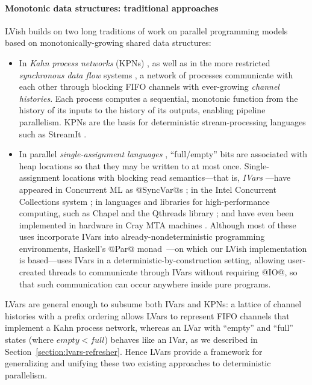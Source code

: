 \paragraph{Monotonic data structures: traditional approaches}

LVish builds on two long traditions of work on parallel programming
models based on monotonically-growing shared data structures:
\begin{itemize}
\item In {\em Kahn process networks} (KPNs) \cite{Kahn-1974}, as well
  as in the more restricted {\em synchronous data flow} systems
  \cite{Lee-sdn}, a network of processes communicate with each other
  through blocking FIFO channels with ever-growing {\em channel
    histories}.  Each process computes a sequential, monotonic
  function from the history of its inputs to the history of its
  outputs, enabling pipeline parallelism.  KPNs are the basis for
  deterministic stream-processing languages such as StreamIt
  \cite{streamit-asplos}.
\item In parallel {\em single-assignment languages}
  \cite{Tesler-1968}, ``full/empty'' bits are associated with heap
  locations so that they may be written to at most once.
  Single-assignment locations with blocking read semantics---that is,
  \emph{IVars} \cite{IStructures}---have appeared in Concurrent ML as
  @SyncVar@s \cite{reppy-cml-book}; in the Intel Concurrent
  Collections system \cite{CnC}; in languages and libraries for
  high-performance computing, such as Chapel \cite{chapel} and the
  Qthreads library \cite{qthreads}; and have even been implemented in
  hardware in Cray MTA machines \cite{cray-mta}.  Although most of
  these uses incorporate IVars into already-nondeterministic
  programming environments, Haskell's @Par@
  monad~\cite{monad-par}---on which our LVish implementation is
  based---uses IVars in a deterministic-by-construction setting,
  allowing user-created threads to communicate through IVars without
  requiring @IO@, so that such communication can occur anywhere inside
  pure programs.
\end{itemize}
LVars are general enough to subsume both IVars and KPNs: a lattice of
channel histories with a prefix ordering allows LVars to represent
FIFO channels that implement a Kahn process network, whereas an LVar
with ``empty'' and ``full'' states (where $\mathit{empty} <
\mathit{full}$) behaves like an IVar, as we described in
Section~\ref{section:lvars-refresher}.  Hence LVars provide a
framework for generalizing and unifying these two existing approaches
to deterministic parallelism.

